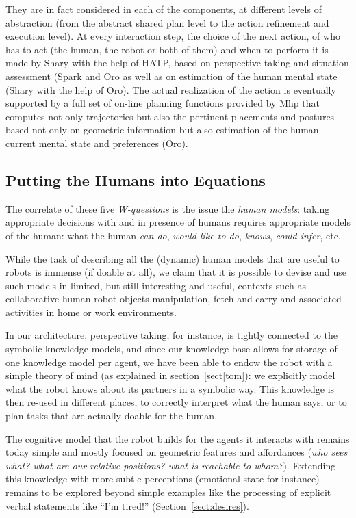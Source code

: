\documentclass[preprint,3p,times]{elsarticle}
\begin{document}
They are in fact considered in each of the components, at different levels of
abstraction (from the abstract shared plan level to the action refinement and
execution level).  At every interaction step, the choice of the next action, of
who has to act (the human, the robot or both of them) and when to perform it is
made by {\sc Shary} with the help of HATP, based on perspective-taking and
situation assessment ({\sc Spark} and {\sc Oro} as well as on estimation of the
human mental state ({\sc Shary} with the help of {\sc Oro}). The actual
realization of the action is eventually supported by a full set of on-line
planning functions provided by {\sc Mhp} that computes not only trajectories but
also the pertinent placements and postures based not only on geometric
information but also estimation of the human current mental state and
preferences ({\sc Oro}).

\subsection{Putting the Humans into Equations}

The correlate of these five \emph{W-questions} is the issue the \emph{human
models}: taking appropriate decisions with and in presence of humans requires
appropriate models of the human: what the human \emph{can do}, \emph{would like
to do}, \emph{knows}, \emph{could infer}, etc.

While the task of describing all the (dynamic) human models that are useful to
robots is immense (if doable at all), we claim that it is possible to devise and
use such models in limited, but still interesting and useful, contexts such as
collaborative human-robot objects manipulation, fetch-and-carry and associated
activities in home or work environments.

In our architecture, perspective taking, for instance, is tightly connected to
the symbolic knowledge models, and since our knowledge base allows for storage
of one knowledge model per agent, we have been able to endow the robot with a
simple theory of mind (as explained in section~\ref{sect|tom}): we explicitly
model what the robot knows about its partners in a symbolic way. This knowledge
is then re-used in different places, to correctly interpret what the human says,
or to plan tasks that are actually doable for the human.

The cognitive model that the robot builds for the agents it interacts with
remains today simple and mostly focused on geometric features and affordances
(\emph{who sees what? what are our relative positions? what is reachable to
whom?}). Extending this knowledge with more subtle perceptions (emotional
state for instance) remains to be explored beyond simple examples like the
processing of explicit verbal statements like ``I'm tired!''
(Section~\ref{sect:desires}).
\end{document}
